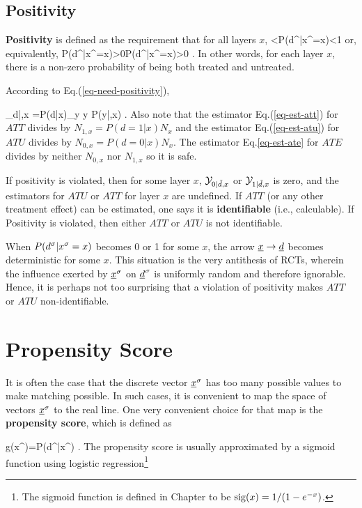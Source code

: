 \subsection{Positivity}


{\bf Positivity} is defined as the
requirement that for all layers $x$,
<P(d^|x^\s=x)<1
\eeq
or, equivalently, 
\beq
P(d^|x^\s=x)>0P(d^|x^\s=x)>0
\;.
\eeq
In other words, 
for each layer $x$,
there is
a non-zero
probability of being both treated 
and untreated.

According to  Eq.(\ref{eq-need-positivity}),

\beq
\caly_{d|\td,x}
=P(d|x)\sum_{y} y P(y|\td,x)
\;.
\eeq
Also note
that the estimator
Eq.(\ref{eq-est-att})
for $ATT$ divides by $N_{1,x}=P(d=1|x)N_x$
and 
the estimator
Eq.(\ref{eq-est-atu})
for $ATU$ divides by $N_{0,x}= P(d=0|x)N_x$.
The estimator Eq.\ref{eq-est-ate}
for $ATE$ divides by neither $N_{0,x}$
nor $N_{1,x}$ so it is safe.

If positivity is violated,
then 
for some 
layer $x$, 
 ${\cal Y}_{0|{\tilde{d}},x}$ or ${\cal Y}_{1|{\tilde{d}},x}$ 
is zero, 
and the estimators
for $ATU$ or $ATT$ for layer $x$ are
undefined.
If $ATT$ (or any
other treatment effect)  can be estimated,
one says it is {\bf identifiable} (i.e.,
calculable). If Positivity is violated, then
either $ATT$ or $ATU$ is not identifiable.

 

When 
$P(d^\sigma|x^\sigma=x)$ 
becomes 0 or 1 for some $x$,
the arrow
${\underline{x}}\rightarrow{\underline{d}}$
becomes deterministic
for some $x$.
This situation
is
the very 
antithesis
of RCTs,
wherein 
the influence
exerted by ${\underline{x}}^\sigma$ on 
${\underline{d}}^\sigma$ is uniformly
random and therefore ignorable.
Hence, it is perhaps 
not too surprising
that a violation
of positivity makes
$ATT$ or $ATU$
non-identifiable.



\section{Propensity Score}

It is often the case
that the discrete vector ${\underline{x}}^\sigma$
has
too many possible values to make
matching possible.
In such cases, it
is convenient to 
map the space
of vectors
${\underline{x}}^\sigma$
to the real line.
One very  
convenient choice
for that map
is the 
{\bf propensity score},
which is defined as

\beq
g(x^\s)=P(d^|x^\s)
\;.
\eeq
The
propensity
score
is usually
approximated
by a sigmoid
function
using logistic regression\footnote{
The sigmoid function is defined
in Chapter 
to be ${\rm sig} (x) = 1/(1-e^{-x})$.}

